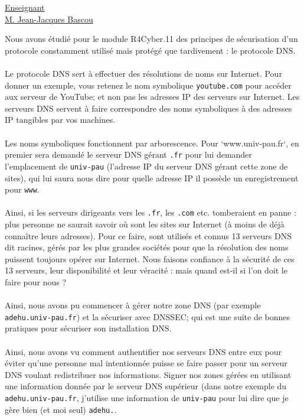 \renewcommand{\figurename}{}

\vspace*{0.2cm}%
      \large
      \href{}{\color{black}Enseignant\\M. Jean-Jacques Bascou}\\%
      \normalsize
\vspace*{0.5cm}%


Nous avons étudié pour le module R4Cyber.11 des principes de sécurisation d'un protocole constamment utilisé mais protégé que tardivement : le protocole DNS.
\\ \\
Le protocole DNS sert à effectuer des résolutions de noms sur Internet. Pour donner un exemple, vous retenez le nom symbolique \texttt{youtube.com} pour accéder aux serveur de YouTube; et non pas les adresses IP des serveurs sur Internet. Les serveurs DNS servent à faire correspondre des noms symboliques à des adresses IP tangibles par vos machines.
\\ \\
Les noms symboliques fonctionnent par arborescence. Pour `www.univ-pau.fr`, en premier sera demandé le serveur DNS gérant \texttt{.fr} pour lui demander l'emplacement de \texttt{univ-pau} (l'adresse IP du serveur DNS gérant cette zone de sites), qui lui saura nous dire pour quelle adresse IP il possède un enregistrement pour \texttt{www}.
\\ \\
Ainsi, si les serveurs dirigeants vers les \texttt{.fr}, les \texttt{.com} etc. tomberaient en panne : plus personne ne saurait savoir où sont les sites sur Internet (à moins de déjà connaître leurs adresses). Pour ce faire, sont utilisés et connus 13 serveurs DNS dit racines, gérés par les plus grandes sociétés pour que la résolution des noms puissent toujours opérer sur Internet. Nous faisons confiance à la sécurité de ces 13 serveurs, leur disponibilité et leur véracité : mais quand est-il si l'on doit le faire pour nous ?
\\ \\
Ainsi, nous avons pu commencer à gérer notre zone DNS (par exemple \texttt{adehu.univ-pau.fr}) et la sécuriser avec DNSSEC; qui est une suite de bonnes pratiques pour sécuriser son installation DNS.
\\ \\
Ainsi, nous avons vu comment authentifier nos serveurs DNS entre eux pour éviter qu'une personne mal intentionnée puisse se faire passer pour un serveur DNS voulant redistribuer nos informations. Signer nos zones gérées en utilisant une information donnée par le serveur DNS supérieur (dans notre exemple du \texttt{adehu.univ-pau.fr}, j'utilise une information de \texttt{univ-pau} pour lui dire que je gère bien (et moi seul) \texttt{adehu.}.